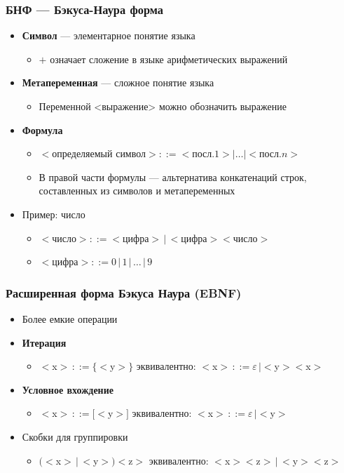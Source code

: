 \documentclass{beamer}
\begin{document}
\begin{frame}[fragile]
  \transwipe[direction=90]
  \frametitle{БНФ ---  Бэкуса-Наура форма}
  \begin{itemize}
    \item \textbf{Символ} --- элементарное понятие языка
    \begin{itemize}
      \item $+$ означает сложение в языке арифметических выражений
    \end{itemize}
    \item \textbf{Метапеременная} --- сложное понятие языка
    \begin{itemize}
      \item Переменной <выражение> можно обозначить выражение
    \end{itemize}
    \item \textbf{Формула}
    \begin{itemize}
      \item $<$определяемый символ$> ::= <$посл$.1> | \dots | <$посл$.n>$
      \item В правой части формулы --- альтернатива конкатенаций строк, составленных из символов и метапеременных
    \end{itemize}  
    \item Пример: число
    \begin{itemize}
      \item $<$число$> ::= <$цифра$> \, | \, <$цифра$><$число$>$ 
      \item $<$цифра$> ::= 0 \, | \, 1 \, | \, \dots \, | \, 9 $ 
    \end{itemize}
  \end{itemize}  
\end{frame}
    
 \begin{frame}[fragile]
   \transwipe[direction=90]
   \frametitle{Расширенная форма Бэкуса Наура (EBNF)}
   \begin{itemize}
     \item Более емкие операции
      \item \textbf{Итерация}  
      \begin{itemize}
        \item $<$x$> \, ::= \{ <$y$> \}$ эквивалентно: $<$x$> \, ::= \varepsilon \, | <$y$><$x$>$
      \end{itemize}   
      \item \textbf{Условное вхождение}  
      \begin{itemize}
        \item $<$x$> \, ::= [ <$y$> ]$ эквивалентно: $<$x$> \, ::= \varepsilon \, | <$y$>$
      \end{itemize}  
      \item Скобки для группировки
      \begin{itemize}
        \item $(<$x$> \, | \, <$y$>) <$z$>$ эквивалентно: $<$x$><$z$> \, | \, <$y$><$z$>$
      \end{itemize} 
  \end{itemize}
\end{frame}
\end{document}
